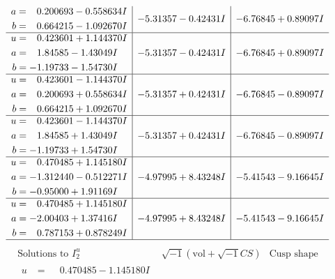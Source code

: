 \documentclass[1p]{elsarticle_modified}
\theoremstyle{definition}
\newcommand{\I}{\sqrt{-1}}
\begin{document}
$$\begin{array}{c|c|c}
\begin{aligned}
a &= \phantom{-}0.200693 - 0.558634 I \\
b &= \phantom{-}0.664215 - 1.092670 I\end{aligned}
 & -5.31357 - 0.42431 I & -6.76845 + 0.89097 I \\ \hline\begin{aligned}
u &= \phantom{-}0.423601 + 1.144370 I \\
a &= \phantom{-}1.84585 - 1.43049 I \\
b &= -1.19733 - 1.54730 I\end{aligned}
 & -5.31357 - 0.42431 I & -6.76845 + 0.89097 I \\ \hline\begin{aligned}
u &= \phantom{-}0.423601 - 1.144370 I \\
a &= \phantom{-}0.200693 + 0.558634 I \\
b &= \phantom{-}0.664215 + 1.092670 I\end{aligned}
 & -5.31357 + 0.42431 I & -6.76845 - 0.89097 I \\ \hline\begin{aligned}
u &= \phantom{-}0.423601 - 1.144370 I \\
a &= \phantom{-}1.84585 + 1.43049 I \\
b &= -1.19733 + 1.54730 I\end{aligned}
 & -5.31357 + 0.42431 I & -6.76845 - 0.89097 I \\ \hline\begin{aligned}
u &= \phantom{-}0.470485 + 1.145180 I \\
a &= -1.312440 - 0.512271 I \\
b &= -0.95000 + 1.91169 I\end{aligned}
 & -4.97995 + 8.43248 I & -5.41543 - 9.16645 I \\ \hline\begin{aligned}
u &= \phantom{-}0.470485 + 1.145180 I \\
a &= -2.00403 + 1.37416 I \\
b &= \phantom{-}0.787153 + 0.878249 I\end{aligned}
 & -4.97995 + 8.43248 I & -5.41543 - 9.16645 I\\
 \hline 
 \end{array}$$\newpage$$\begin{array}{c|c|c}  
\text{Solutions to }I^u_{2}& \I (\text{vol} + \sqrt{-1}CS) & \text{Cusp shape}\\
 \hline 
\begin{aligned}
u &= \phantom{-}0.470485 - 1.145180 I \\

\end{aligned}
\end{array}$$
\end{document}
